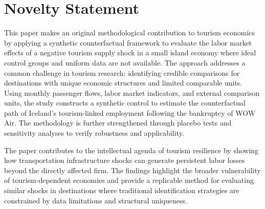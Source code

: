 \documentclass[12pt]{article}
\begin{document}
\newpage
\section*{Novelty Statement}

This paper makes an original methodological contribution to tourism economics by applying a synthetic counterfactual framework to evaluate the labor market effects of a negative tourism supply shock in a small island economy where ideal control groups and uniform data are not available. The approach addresses a common challenge in tourism research: identifying credible comparisons for destinations with unique economic structures and limited comparable units. Using monthly passenger flows, labor market indicators, and external comparison units, the study constructs a synthetic control to estimate the counterfactual path of Iceland’s tourism-linked employment following the bankruptcy of WOW Air. The methodology is further strengthened through placebo tests and sensitivity analyses to verify robustness and applicability.

The paper contributes to the intellectual agenda of tourism resilience by showing how transportation infrastructure shocks can generate persistent labor losses beyond the directly affected firm. The findings highlight the broader vulnerability of tourism-dependent economies and provide a replicable method for evaluating similar shocks in destinations where traditional identification strategies are constrained by data limitations and structural uniqueness.
\end{document}
